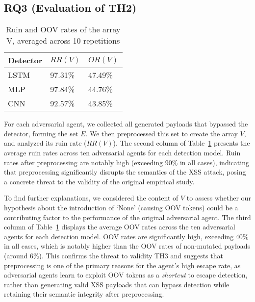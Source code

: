 \subsection{RQ3 (Evaluation of TH2)}

\label{sec:rq3}
\begin{table}[!h]
\caption{Ruin and OOV rates of the array V, averaged across 10 repetitions}
\label{tab:rq3}
\centering
\scalebox {1.0} {
\begin{tabular}{lll}
    \toprule
    Detector & $RR(V)$ & $OR(V)$ \\
    \midrule
    LSTM            & 97.31\% & 47.49\%    \\
    MLP             & 97.84\% & 44.76\%  \\
    CNN             & 92.57\% & 43.85\%   \\
    \bottomrule
\end{tabular}
}
\end{table}

For each adversarial agent, we collected all generated payloads that  bypassed the detector, forming the set $E$. We then preprocessed this set to create the array $V$, and analyzed its ruin rate ($RR(V)$). The second column of Table~\ref{tab:rq3} presents the average ruin rates across ten adversarial agents for each detection model. Ruin rates after preprocessing are notably high (exceeding 90\% in all cases), indicating that  preprocessing significantly disrupts the semantics of the XSS attack, posing a concrete threat to the validity of the original empirical study.

To find further explanations, we considered the content of $V$ to assess whether our hypothesis about the introduction of `None' (causing OOV tokens) could be a contributing factor to the performance of the original adversarial agent. %
The third column of Table~\ref{tab:rq3} displays the average OOV rates across the ten adversarial agents for each detection model.  OOV rates are  significantly high, exceeding 40\% in all cases, which is notably higher than the OOV rates of non-mutated payloads (around 6\%). This confirms the threat to validity TH3 and suggests that preprocessing is one of the primary reasons for the agent's high escape rate, as adversarial agents learn to exploit OOV tokens as a \textit{shortcut} to escape detection, rather than generating valid XSS payloads that can bypass detection while retaining their semantic integrity after preprocessing.

